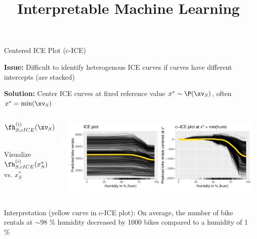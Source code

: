 \documentclass[11pt,compress,t,notes=noshow, aspectratio=169, xcolor=table]{beamer}
\title{Interpretable Machine Learning}
\date{}
\begin{document}
\newcommand{\titlefigure}{figure/pdp_bike}
\newcommand{\learninggoals}{
\item Understand c-ICE curves to identify the heterogeneity in the model
\item Understand the extrapolation issue}



\begin{frame}{Centered ICE Plot (c-ICE)}

\textbf{Issue:} Difficult to identify heterogenous ICE curves if curves have different intercepts (are stacked)

\textbf{Solution:} Center ICE curves at fixed reference value $x^* \sim \P(\xv_S)$, often $x^* = \min(\xv_S)$

\begin{columns}[c]
\begin{column}{0.4\textwidth}
\centering
$$\begin{aligned}
\fh_{S, cICE}^{(i)}(\xv_S)
&= \fh(\xv_S, \xi_C) - \fh(x^*, \xi_C) \\
&= \fh_{S}^{(i)}(\xv_S) - \fh_{S}^{(i)}(x^*)
\end{aligned}$$
Visualize $\fh_{S, cICE}^{(i)}(x_S^*)$ vs. $x_S^*$
\end{column}
\begin{column}{0.59\textwidth}
\begin{center}
\includegraphics[width=\textwidth]{figure/cICE}
\end{center}
\end{column}
\end{columns}


Interpretation (yellow curve in c-ICE plot): On average, the number of bike rentals at $\sim 98$ \% humidity decreased by 1000 bikes compared to a humidity of 1 \%
\end{frame}
\end{document}
